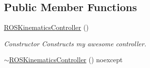 \subsection*{Public Member Functions}
\begin{DoxyCompactItemize}
\item 
\hypertarget{classhiqp_1_1ROSKinematicsController_a8d0a319248f8e3debef076389f832696}{\hyperlink{classhiqp_1_1ROSKinematicsController_a8d0a319248f8e3debef076389f832696}{R\-O\-S\-Kinematics\-Controller} ()}\label{classhiqp_1_1ROSKinematicsController_a8d0a319248f8e3debef076389f832696}

\begin{DoxyCompactList}\small\item\em Constructor Constructs my awesome controller. \end{DoxyCompactList}\item 
\hypertarget{classhiqp_1_1ROSKinematicsController_ab4550e7b5bfd5368c6fcad913bbe4769}{\hyperlink{classhiqp_1_1ROSKinematicsController_ab4550e7b5bfd5368c6fcad913bbe4769}{$\sim$\-R\-O\-S\-Kinematics\-Controller} () noexcept}\label{classhiqp_1_1ROSKinematicsController_ab4550e7b5bfd5368c6fcad913bbe4769}


\end{DoxyCompactItemize}
